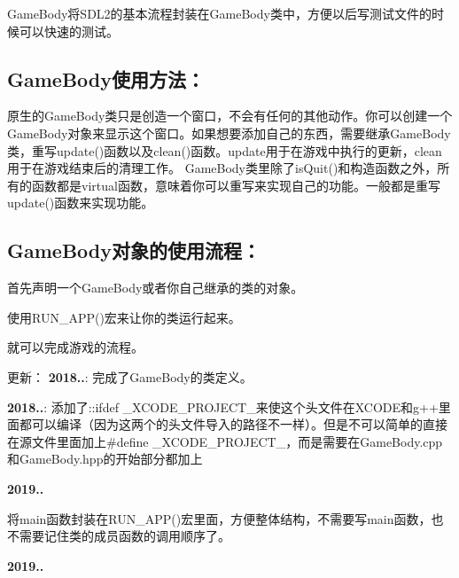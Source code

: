 Game\+Body将\+S\+D\+L2的基本流程封装在\+Game\+Body类中，方便以后写测试文件的时候可以快速的测试。 \subsection*{Game\+Body使用方法：}

原生的\+Game\+Body类只是创造一个窗口，不会有任何的其他动作。你可以创建一个\+Game\+Body对象来显示这个窗口。如果想要添加自己的东西，需要继承\+Game\+Body类，重写update()函数以及clean()函数。update用于在游戏中执行的更新，clean用于在游戏结束后的清理工作。 Game\+Body类里除了is\+Quit()和构造函数之外，所有的函数都是virtual函数，意味着你可以重写来实现自己的功能。一般都是重写update()函数来实现功能。 \subsection*{Game\+Body对象的使用流程：}


\begin{DoxyEnumerate}
\item 首先声明一个\+Game\+Body或者你自己继承的类的对象。
\item 使用\+R\+U\+N\+\_\+\+A\+P\+P()宏来让你的类运行起来。
\end{DoxyEnumerate}

就可以完成游戏的流程。

更新： {\bfseries{2018..}}\+: 完成了\+Game\+Body的类定义。

{\bfseries{2018..}}\+: 添加了\+::ifdef \+\_\+\+X\+C\+O\+D\+E\+\_\+\+P\+R\+O\+J\+E\+C\+T\+\_\+来使这个头文件在\+X\+C\+O\+D\+E和g++里面都可以编译（因为这两个的头文件导入的路径不一样）。但是不可以简单的直接在源文件里面加上\#define \+\_\+\+X\+C\+O\+D\+E\+\_\+\+P\+R\+O\+J\+E\+C\+T\+\_\+，而是需要在\+Game\+Body.\+cpp和\+Game\+Body.\+hpp的开始部分都加上 
\begin{DoxyCode}{0}
\end{DoxyCode}


{\bfseries{2019..}}


\begin{DoxyItemize}
\item 将main函数封装在\+R\+U\+N\+\_\+\+A\+P\+P()宏里面，方便整体结构，不需要写main函数，也不需要记住类的成员函数的调用顺序了。
\end{DoxyItemize}

{\bfseries{2019..}}


